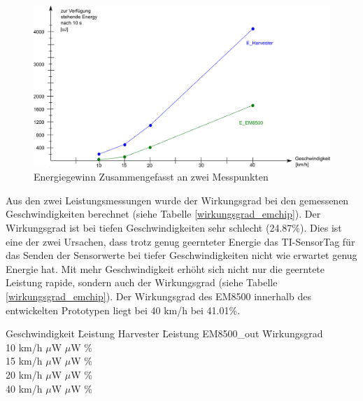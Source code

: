 \begin{figure}[ht]
    \includegraphics[width=1\textwidth]{4Resultate/imag/EnergyGewinnNachStelle.png} 
    \caption{Energiegewinn Zusammengefasst an zwei Messpunkten}
    \label{zsmEnergyGewinn}
\end{figure}

Aus den zwei Leistungsmessungen wurde der Wirkungsgrad bei den gemessenen Geschwindigkeiten berechnet (siehe Tabelle \ref{wirkungsgrad_emchip}). Der Wirkungsgrad ist bei tiefen Geschwindigkeiten sehr schlecht (24.87\thinspace\%). Dies ist eine der zwei Ursachen, dass trotz genug geernteter Energie das TI-SensorTag für das Senden der Sensorwerte bei tiefer Geschwindigkeiten nicht wie erwartet genug Energie hat. Mit mehr Geschwindigkeit erhöht sich nicht nur die geerntete Leistung rapide, sondern auch der Wirkungsgrad (siehe Tabelle \ref{wirkungsgrad_emchip}). Der Wirkungsgrad des EM8500 innerhalb des entwickelten Prototypen liegt bei 40 km/h  bei 41.01\thinspace\%.  

\begin{minipage}{\textwidth}
    \label{wirkungsgrad_emchip}
    \begin{tabbing}
        Geschwindigkeit \quad\= Leistung Harvester \quad\= Leistung EM8500\_out \quad\= Wirkungsgrad\\[0.8ex]
        10 km/h    $\mu$W    $\mu$W \thinspace\%  \\
        15 km/h    $\mu$W   $\mu$W \thinspace\%  \\
        20 km/h  $\mu$W   $\mu$W \thinspace\%  \\
        40 km/h  $\mu$W  $\mu$W \thinspace\%  \\
    \end{tabbing}
\end{minipage}  


